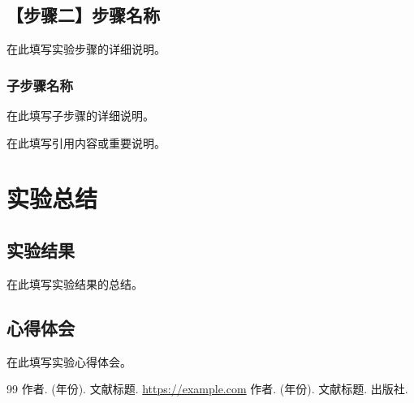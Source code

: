 \documentclass[a4paper]{article}
\begin{document}
\subsection{【步骤二】步骤名称}
在此填写实验步骤的详细说明。

\subsubsection{子步骤名称}
在此填写子步骤的详细说明。

\begin{myquote}[colback=blue!5!white,colframe=blue!75!black,title=引用标题]
在此填写引用内容或重要说明。
\end{myquote}

\newpage

\section{实验总结}

\subsection{实验结果}
在此填写实验结果的总结。

\subsection{心得体会}
在此填写实验心得体会。

\newpage

\begin{thebibliography}{99}
    作者. (年份). 文献标题. \url{https://example.com}
    作者. (年份). 文献标题. 出版社.
\end{thebibliography}
\end{document}
